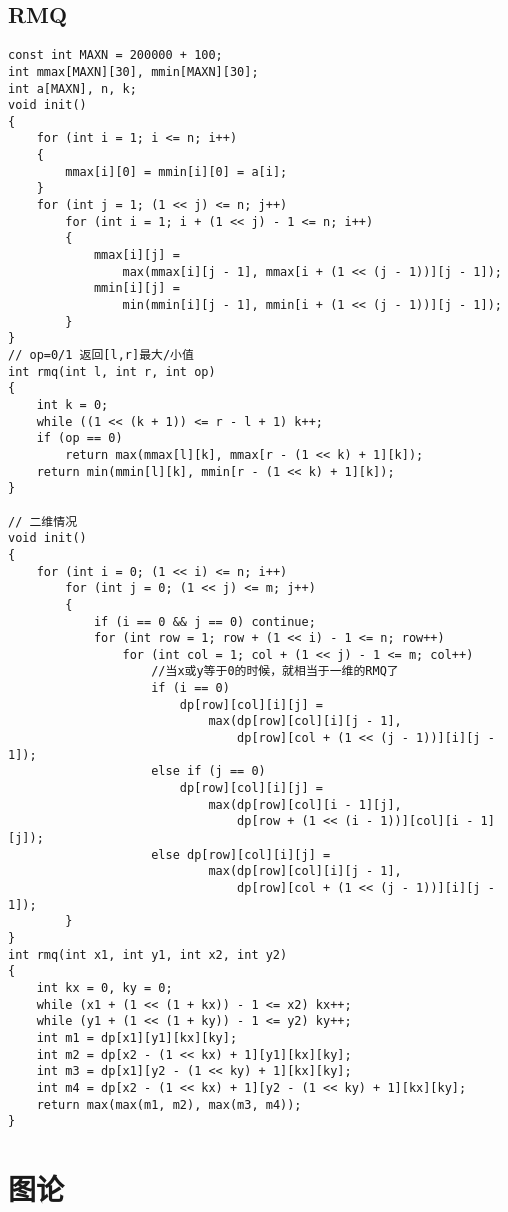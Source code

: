 \documentclass[a4]{article}
\begin{document}
\subsection{RMQ}
\begin{lstlisting}
const int MAXN = 200000 + 100;
int mmax[MAXN][30], mmin[MAXN][30];
int a[MAXN], n, k;
void init()
{
    for (int i = 1; i <= n; i++)
    {
        mmax[i][0] = mmin[i][0] = a[i];
    }
    for (int j = 1; (1 << j) <= n; j++)
        for (int i = 1; i + (1 << j) - 1 <= n; i++)
        {
            mmax[i][j] =
                max(mmax[i][j - 1], mmax[i + (1 << (j - 1))][j - 1]);
            mmin[i][j] =
                min(mmin[i][j - 1], mmin[i + (1 << (j - 1))][j - 1]);
        }
}
// op=0/1 返回[l,r]最大/小值
int rmq(int l, int r, int op)
{
    int k = 0;
    while ((1 << (k + 1)) <= r - l + 1) k++;
    if (op == 0)
        return max(mmax[l][k], mmax[r - (1 << k) + 1][k]);
    return min(mmin[l][k], mmin[r - (1 << k) + 1][k]);
}

// 二维情况
void init()
{
    for (int i = 0; (1 << i) <= n; i++)
        for (int j = 0; (1 << j) <= m; j++)
        {
            if (i == 0 && j == 0) continue;
            for (int row = 1; row + (1 << i) - 1 <= n; row++)
                for (int col = 1; col + (1 << j) - 1 <= m; col++)
                    //当x或y等于0的时候，就相当于一维的RMQ了
                    if (i == 0)
                        dp[row][col][i][j] =
                            max(dp[row][col][i][j - 1],
                                dp[row][col + (1 << (j - 1))][i][j - 1]);
                    else if (j == 0)
                        dp[row][col][i][j] =
                            max(dp[row][col][i - 1][j],
                                dp[row + (1 << (i - 1))][col][i - 1][j]);
                    else dp[row][col][i][j] =
                            max(dp[row][col][i][j - 1],
                                dp[row][col + (1 << (j - 1))][i][j - 1]);
        }
}
int rmq(int x1, int y1, int x2, int y2)
{
    int kx = 0, ky = 0;
    while (x1 + (1 << (1 + kx)) - 1 <= x2) kx++;
    while (y1 + (1 << (1 + ky)) - 1 <= y2) ky++;
    int m1 = dp[x1][y1][kx][ky];
    int m2 = dp[x2 - (1 << kx) + 1][y1][kx][ky];
    int m3 = dp[x1][y2 - (1 << ky) + 1][kx][ky];
    int m4 = dp[x2 - (1 << kx) + 1][y2 - (1 << ky) + 1][kx][ky];
    return max(max(m1, m2), max(m3, m4));
}
\end{lstlisting}
\clearpage\section{图论}
\end{document}
